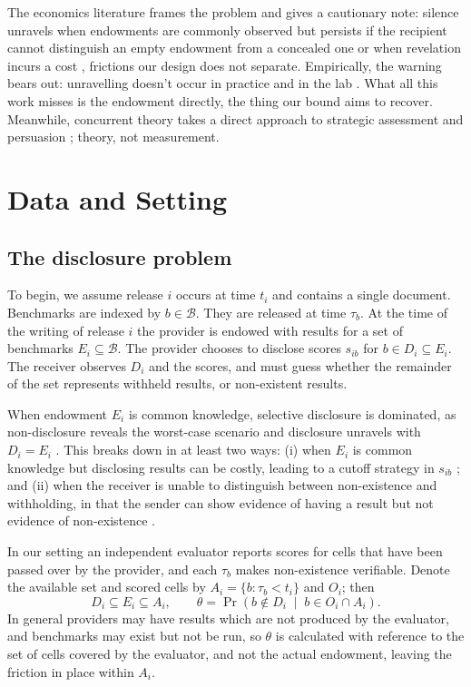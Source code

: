 \documentclass{article}
\begin{document}
The economics literature frames the problem and gives a cautionary note: silence unravels when endowments are commonly observed \citep{grossman1981,milgrom1981} but persists if the recipient cannot distinguish an empty endowment from a concealed one \citep{dye1985,jung1988} or when revelation incurs a cost \citep{verrecchia1983}, frictions our design does not separate. Empirically, the warning bears out: unravelling doesn't occur in practice \citep{dranove2010,jin2003,hotz2013,bederson2018} and in the lab \citep{jinluca2021}. What all this work misses is the endowment directly, the thing our bound aims to recover. Meanwhile, concurrent theory takes a direct approach to strategic assessment and persuasion \citep{truong2026strategic,dai2026persuasion}; theory, not measurement.
\section{Data and Setting}\label{sec:data}

\subsection{The disclosure problem}\label{sec:data-model}

To begin, we assume release $i$ occurs at time $t_i$ and contains a single document. Benchmarks are indexed by $b \in \mathcal{B}$. They are released at time $\tau_b$. At the time of the writing of release $i$ the provider is endowed with results for a set of benchmarks $E_i \subseteq \mathcal{B}$. The provider chooses to disclose scores $s_{ib}$ for $b \in D_i \subseteq E_i$. The receiver observes $D_i$ and the scores, and must guess whether the remainder of the set represents withheld results, or non-existent results.

When endowment $E_i$ is common knowledge, selective disclosure is dominated, as non-disclosure reveals the worst-case scenario and disclosure unravels with $D_i = E_i$ \citep{grossman1981,milgrom1981}. This breaks down in at least two ways: (i) when $E_i$ is common knowledge but disclosing results can be costly, leading to a cutoff strategy in $s_{ib}$ \citep{verrecchia1983}; and (ii) when the receiver is unable to distinguish between non-existence and withholding, in that the sender can show evidence of having a result but not evidence of non-existence \citep[Section 3]{dye1985}.

In our setting an independent evaluator reports scores for cells that have been passed over by the provider, and each $\tau_b$ makes non-existence verifiable. Denote the available set and scored cells by $A_i = \{b : \tau_b < t_i\}$ and $O_i$; then
\[
D_i \subseteq E_i \subseteq A_i, \qquad \theta = \Pr\!\left(b \notin D_i \;\middle|\; b \in O_i \cap A_i\right).
\]
In general providers may have results which are not produced by the evaluator, and benchmarks may exist but not be run, so $\theta$ is calculated with reference to the set of cells covered by the evaluator, and not the actual endowment, leaving the \citet{dye1985} friction in place within $A_i$.
\end{document}

